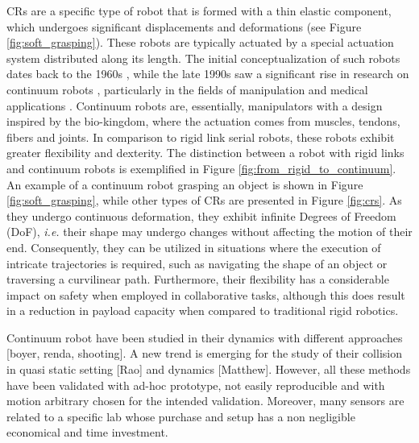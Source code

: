 \documentclass[14pt, a4paper]{article}
\newcommand{\ie}{\textit{i.e.}}
\begin{document}
CRs are a specific type of robot that is formed with a thin elastic component, which undergoes significant displacements and deformations \cite{Robinson1999} (see Figure \ref{fig:soft_grasping}).
These robots are typically actuated by a special actuation system distributed along its length.
The initial conceptualization of such robots dates back to the 1960s \cite{Anderson1967}, while the late 1990s saw a significant rise in research on continuum robots \cite{Russo2023}, particularly in the fields of manipulation \cite{Kolachalama2020} and medical applications \cite{BurgnerKahrs2015, Dupont2022}.
%
%
Continuum robots are, essentially, manipulators with a design inspired by the bio-kingdom, where the actuation comes from muscles, tendons, fibers and joints. 
%
%
In comparison to rigid link serial robots, these robots exhibit greater flexibility and dexterity. 
The distinction between a robot with rigid links and continuum robots is exemplified in Figure \ref{fig:from_rigid_to_continuum}. 
An example of a continuum robot grasping an object is shown in Figure \ref{fig:soft_grasping}, while other types of CRs are presented in Figure \ref{fig:crs}.
%
%
As they undergo continuous deformation, they exhibit infinite Degrees of Freedom (DoF), \ie{} their shape may undergo changes without affecting the motion of their end. 
Consequently, they can be utilized in situations where the execution of intricate trajectories is required, such as navigating the shape of an object or traversing a curvilinear path.
%
% 
Furthermore, their flexibility has a considerable impact on safety when employed in collaborative tasks, although this does result in a reduction in payload capacity when compared to traditional rigid robotics.


Continuum robot have been studied in their dynamics with different approaches [boyer, renda, shooting]. A new trend is emerging for the study of their collision in quasi static setting [Rao] and dynamics [Matthew].
However, all these methods have been validated with ad-hoc prototype, not easily reproducible and with motion arbitrary chosen for the intended validation.
Moreover, many sensors are related to a specific lab whose purchase and setup has a non negligible economical and time investment.
\end{document}
